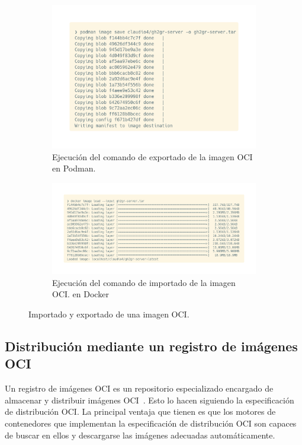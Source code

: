 \begin{figure}
    \begin{subfigure}{0.49\textwidth}
        \includegraphics[width=\linewidth]{images/export-server-image.png}
        \caption{Ejecución del comando de exportado de la imagen OCI en Podman.} \label{fig:export-oci-image}
    \end{subfigure}
    \hspace*{\fill}   %
    \begin{subfigure}{0.49\textwidth}
        \includegraphics[width=\linewidth]{images/import-server-image.png}
        \caption{Ejecución del comando de importado de la imagen OCI. en Docker} \label{fig:import-oci-image}
    \end{subfigure}
    \caption{Importado y exportado de una imagen OCI.}
\end{figure}


\subsection{Distribución mediante un registro de imágenes OCI}
Un registro de imágenes \acrshort{OCI} es un repositorio especializado encargado de almacenar y distribuir imágenes \acrshort{OCI}~\cite{ociDistribution}. Esto lo hacen siguiendo la especificación de distribución \acrshort{OCI}. La principal ventaja que tienen es que los motores de contenedores que implementan la especificación de distribución \acrshort{OCI} son capaces de buscar en ellos y descargarse las imágenes adecuadas automáticamente.

